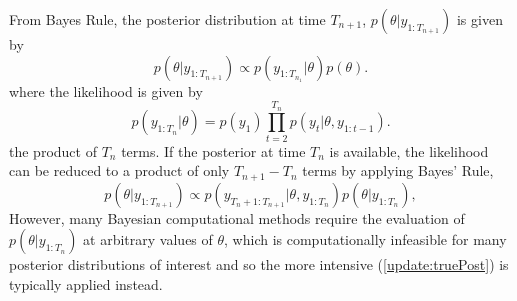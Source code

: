 \documentclass[12pt,a4paper]{article}\usepackage[]{graphicx}\usepackage[]{color}
\begin{document}
From Bayes Rule, the posterior distribution at time $T_{n+1}$, $p(\theta | y_{1:T_{n+1}})$ is given by
\begin{equation}
\label{update:truePost}
p(\theta | y_{1:T_{n+1}}) \propto p(y_{1:T_{n_1}} | \theta)p(\theta).
\end{equation}
where the likelihood is given by
\begin{equation}
\label{update:likelihood}
p(y_{1:T_n} | \theta) = p(y_1) \prod_{t=2}^{T_n} p(y_t | \theta, y_{1:t-1}).
\end{equation}
the product of $T_n$ terms. If the posterior at time $T_{n}$ is available, the likelihood can be reduced to a product of only $T_{n+1} - T_{n}$ terms by applying Bayes' Rule,
\begin{equation}
\label{update:updatePost}
p(\theta | y_{1:T_{n+1}}) \propto p(y_{T_{n}+1:T_{n+1}} | \theta, y_{1:T_{n}})p(\theta | y_{1:T_{n}}),
\end{equation}
However, many Bayesian computational methods require the evaluation of $p(\theta | y_{1:T_{n}})$ at arbitrary values of $\theta$, which is computationally infeasible for many posterior distributions of interest and so the more intensive (\ref{update:truePost}) is typically applied instead.
\\
\end{document}
